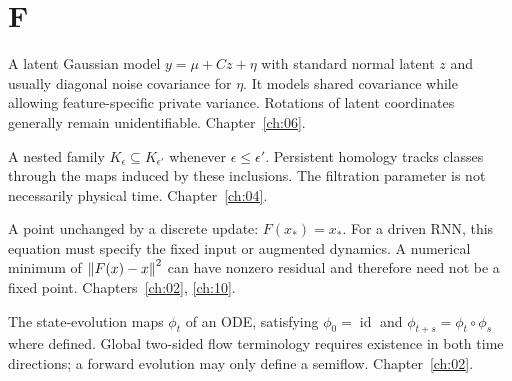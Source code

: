 \section*{F}
\begin{description}[style=nextline]
\item[Factor analysis.] A latent Gaussian model $y=\mu+Cz+\eta$ with standard normal latent $z$ and usually diagonal noise covariance for $\eta$. It models shared covariance while allowing feature-specific private variance. Rotations of latent coordinates generally remain unidentifiable. Chapter~\ref{ch:06}.
\item[Filtration.] A nested family $K_{\epsilon}\subseteq K_{\epsilon'}$ whenever $\epsilon\leq\epsilon'$. Persistent homology tracks classes through the maps induced by these inclusions. The filtration parameter is not necessarily physical time. Chapter~\ref{ch:04}.
\item[Fixed point.] A point unchanged by a discrete update: $F(x_*)=x_*$. For a driven RNN, this equation must specify the fixed input or augmented dynamics. A numerical minimum of $\left\lVert F(x)-x\right\rVert^2$ can have nonzero residual and therefore need not be a fixed point. Chapters~\ref{ch:02}, \ref{ch:10}.
\item[Flow.] The state-evolution maps $\phi_t$ of an ODE, satisfying $\phi_0=\operatorname{id}$ and $\phi_{t+s}=\phi_t\circ\phi_s$ where defined. Global two-sided flow terminology requires existence in both time directions; a forward evolution may only define a semiflow. Chapter~\ref{ch:02}.
\end{description}

